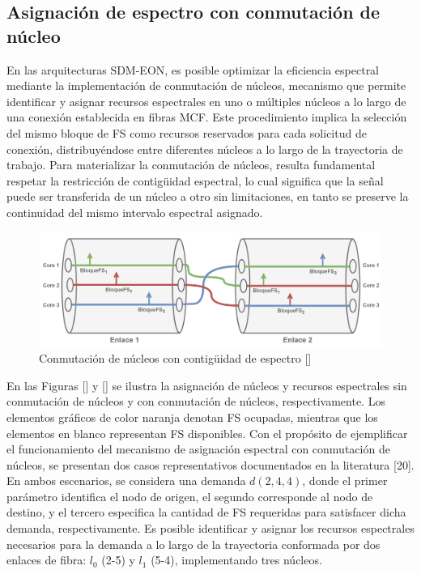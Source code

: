 \subsection{Asignación de espectro con conmutación de núcleo}

En las arquitecturas SDM-EON, es posible optimizar la eficiencia espectral mediante la implementación de conmutación de núcleos, mecanismo que permite identificar y asignar recursos espectrales en uno o múltiples núcleos a lo largo de una conexión establecida en fibras MCF.
 Este procedimiento implica la selección del mismo bloque de FS como recursos reservados para cada solicitud de conexión, distribuyéndose entre diferentes núcleos a lo largo de la trayectoria de trabajo.
 Para materializar la conmutación de núcleos, resulta fundamental respetar la restricción de contigüidad espectral, lo cual significa que la señal puede ser transferida de un núcleo a otro sin limitaciones, en tanto se preserve la continuidad del mismo intervalo espectral asignado.

\begin{figure}[H]
    \centering
    \includegraphics[width=1\textwidth]{capitulos/img/CONMUNATCION_NUCLEOS.png}
    \caption{ Conmutación de núcleos con contigüidad de espectro []}
    \label{fig:CONMUNATCION_NUCLEOS}
\end{figure}

En las Figuras [] y [] se ilustra la asignación de núcleos y recursos espectrales sin conmutación de núcleos y con conmutación de núcleos, respectivamente. Los elementos gráficos de color naranja denotan FS ocupadas, mientras que los elementos en blanco representan FS disponibles. Con el propósito de ejemplificar el funcionamiento del mecanismo de asignación espectral con conmutación de núcleos, se presentan dos casos representativos documentados en la literatura [20]. En ambos escenarios, se considera una demanda $d(2,4,4)$, donde el primer parámetro identifica el nodo de origen, el segundo corresponde al nodo de destino, y el tercero especifica la cantidad de FS requeridas para satisfacer dicha demanda, respectivamente. Es posible identificar y asignar los recursos espectrales necesarios para la demanda a lo largo de la trayectoria conformada por dos enlaces de fibra: $l_0$ (2-5) y $l_1$ (5-4), implementando tres núcleos. 

